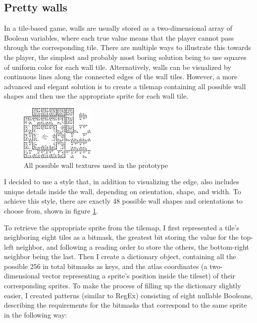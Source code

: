 \subsection{Pretty walls}

In a tile-based game, walls are usually stored as a two-dimensional array of Boolean variables, where each true value means that the player cannot pass through the corresponding tile. There are multiple ways to illustrate this towards the player, the simplest and probably most boring solution being to use squares of uniform color for each wall tile. Alternatively, walls can be visualized by continuous lines along the connected edges of the wall tiles. However, a more advanced and elegant solution is to create a tilemap containing all possible wall shapes and then use the appropriate sprite for each wall tile.

\begin{figure}[h]
    \centering
    \includegraphics{images/walls.png} 
    \caption{All possible wall textures used in the prototype}
    \label{figure:walls}
\end{figure}

I decided to use a style that, in addition to visualizing the edge, also includes unique details inside the wall, depending on orientation, shape, and width. To achieve this style, there are exactly 48 possible wall shapes and orientations to choose from, shown in figure \ref{figure:walls}.

To retrieve the appropriate sprite from the tilemap, I first represented a tile's neighboring eight tiles as a bitmask, the greatest bit storing the value for the top-left neighbor, and following a reading order to store the others, the bottom-right neighbor being the last. Then I create a dictionary object, containing all the possible 256 in total bitmasks as keys, and the atlas coordinates (a two-dimensional vector representing a sprite's position inside the tileset) of their corresponding sprites. To make the process of filling up the dictionary slightly easier, I created patterns (similar to RegEx) consisting of eight nullable Booleans, describing the requirements for the bitmasks that correspond to the same sprite in the following way:

